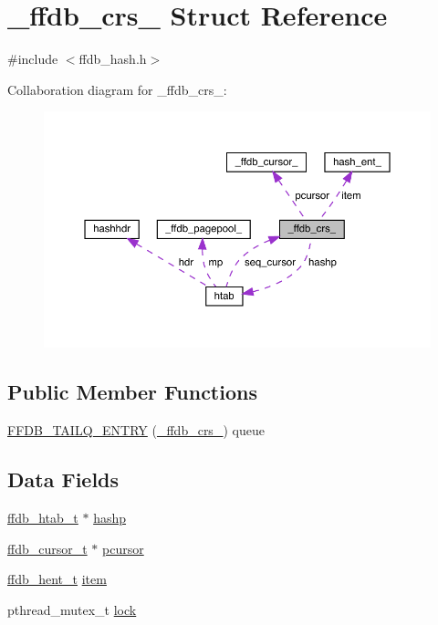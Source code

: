 \hypertarget{struct__ffdb__crs__}{}\section{\+\_\+ffdb\+\_\+crs\+\_\+ Struct Reference}
\label{struct__ffdb__crs__}


{\ttfamily \#include $<$ffdb\+\_\+hash.\+h$>$}



Collaboration diagram for \+\_\+ffdb\+\_\+crs\+\_\+\+:\nopagebreak
\begin{figure}[H]
\begin{center}
\leavevmode
\includegraphics[width=350pt]{d6/d73/struct__ffdb__crs____coll__graph}
\end{center}
\end{figure}
\subsection*{Public Member Functions}
\begin{DoxyCompactItemize}
\item 
\mbox{\hyperlink{struct__ffdb__crs___ab69f088c55ed68ebc0cc2ed6342ef782}{F\+F\+D\+B\+\_\+\+T\+A\+I\+L\+Q\+\_\+\+E\+N\+T\+RY}} (\mbox{\hyperlink{struct__ffdb__crs__}{\+\_\+ffdb\+\_\+crs\+\_\+}}) queue
\end{DoxyCompactItemize}
\subsection*{Data Fields}
\begin{DoxyCompactItemize}
\item 
\mbox{\hyperlink{ffdb__hash_8h_ae592010ed2bedc975d3cc0b7d074b9d1}{ffdb\+\_\+htab\+\_\+t}} $\ast$ \mbox{\hyperlink{struct__ffdb__crs___a24de063362cf44602bfa5d56c9bae574}{hashp}}
\item 
\mbox{\hyperlink{other__libs_2filedb_2filehash_2ffdb__db_8h_a1383f6fb3966b0ca74206ba93b687fd9}{ffdb\+\_\+cursor\+\_\+t}} $\ast$ \mbox{\hyperlink{struct__ffdb__crs___ad0d04ea484ea452ea3f04c9685b69a01}{pcursor}}
\item 
\mbox{\hyperlink{ffdb__hash_8h_aa1cea5ccbd6513ed152988f7a71a936d}{ffdb\+\_\+hent\+\_\+t}} \mbox{\hyperlink{struct__ffdb__crs___afa4e8bde8a789a61d3078df069fd70d1}{item}}
\item 
pthread\+\_\+mutex\+\_\+t \mbox{\hyperlink{struct__ffdb__crs___a91ff97087fd24de639a6efce36da30e2}{lock}}
\end{DoxyCompactItemize}


